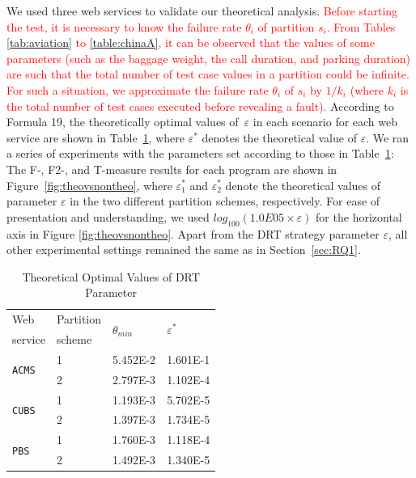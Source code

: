 \documentclass[10pt,journal,compsoc]{IEEEtran}
\begin{document}
We used three web services to validate our theoretical analysis.
\textcolor{red}{Before starting the test, it is necessary to know the failure rate $\theta_i$ of partition $s_i$. From Tables \ref{tab:aviation} to \ref{table:chinaA}, it can be observed that the values of some parameters (such as the baggage weight, the call duration, and parking duration) are such that the total number of test case values in a partition could be infinite. For such a situation, we approximate the failure rate $\theta_i$ of $s_i$ by $1 / k_i$ (where $k_i$ is the total number of test cases executed before revealing a fault).}
According to Formula 19, the theoretically optimal values of~$\varepsilon$ in each scenario for each web service are shown in Table~\ref{tab:parameters}, where $\varepsilon^{*}$ denotes the theoretical value of $\varepsilon$.
We ran a series of experiments with the parameters set according to those in Table~\ref{tab:parameters}:
The F-, F2-, and T-measure results for each  program are shown in Figure~\ref{fig:theovsnontheo}, where $\varepsilon_1^{*}$ and $\varepsilon_2^{*}$ denote the theoretical values of parameter $\varepsilon$ in the two different partition schemes, respectively.
For ease of presentation and understanding, we used $log_{100}(1.0E05 \times \varepsilon)$ for the horizontal axis in Figure \ref{fig:theovsnontheo}.
Apart from the DRT strategy parameter $\varepsilon$, all other experimental settings remained the same as in Section~\ref{sec:RQ1}.

\begin{table}
  \caption{Theoretical Optimal Values of DRT Parameter}
  \centering
  \label{tab:parameters}
  \begin{tabular}{llll} \toprule
     Web                         & Partition  &\multirow{2}{*}{$\theta_{min}$}   &\multirow{2}{*}{$\varepsilon^{*}$}    \\
     service                     & scheme     &                 &                \\ \midrule
     \multirow{2}{*}{\texttt{ACMS}}       &1           &5.452E-2         &1.601E-1        \\
                                 &2           &2.797E-3         &1.102E-4        \\ \midrule
     \multirow{2}{*}{\texttt{CUBS}}       &1           &1.193E-3         &5.702E-5        \\
                                 &2           &1.397E-3         &1.734E-5        \\ \midrule
     \multirow{2}{*}{\texttt{PBS}}        &1           &1.760E-3         &1.118E-4        \\ \
                                 &2           &1.492E-3         &1.340E-5        \\ \bottomrule
  \end{tabular}
\end{table}
\end{document}
